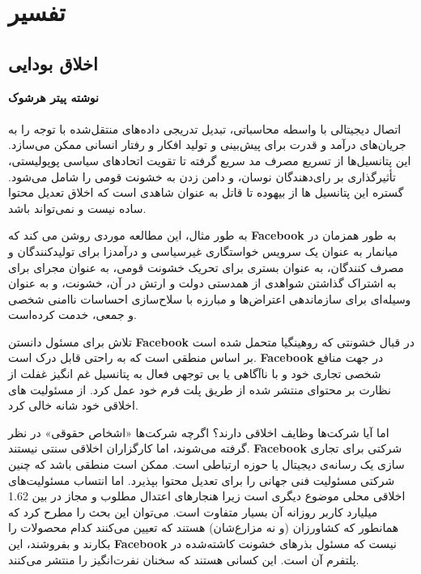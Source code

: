 {
\section*{تفسیر}
\label{sec:تفسیر}


\subsection*{اخلاق بودایی}
\label{subsec:اخلاق بودایی}
\noindent \textbf{نوشته پیتر هرشوک}
\\\\
اتصال دیجیتالی با واسطه محاسباتی، تبدیل تدریجی داده‌های منتقل‌شده با توجه را به جریان‌های درآمد و قدرت برای پیش‌بینی و تولید افکار و رفتار انسانی ممکن می‌سازد. این پتانسیل‌ها از تسریع مصرف مد سریع گرفته تا تقویت اتحادهای سیاسی پوپولیستی، تأثیرگذاری بر رای‌دهندگان نوسان، و دامن زدن به خشونت قومی را شامل می‌شود. گستره این پتانسیل ها از بیهوده تا قاتل به عنوان شاهدی است که اخلاق تعدیل محتوا ساده نیست و نمی‌تواند باشد.
}

به طور مثال، این مطالعه موردی روشن می کند که \textenglish{\textbf{Facebook}} به طور همزمان در میانمار به عنوان یک سرویس خواستگاری غیرسیاسی و درآمدزا برای تولیدکنندگان و مصرف کنندگان، به عنوان بستری برای تحریک خشونت قومی، به عنوان مجرای برای به اشتراک گذاشتن شواهدی از همدستی دولت و ارتش در آن، خشونت، و به عنوان وسیله‌ای برای سازماندهی اعتراض‌ها و مبارزه با سلاح‌سازی احساسات ناامنی شخصی و جمعی، خدمت کرده‌است.

تلاش برای مسئول دانستن \textenglish{\textbf{Facebook}} در قبال خشونتی که روهینگیا متحمل شده است بر اساس منطقی است که به راحتی قابل درک است.
\textenglish{\textbf{Facebook}} در جهت منافع شخصی تجاری خود و با ناآگاهی یا بی توجهی فعال به پتانسیل غم انگیز غفلت از نظارت بر محتوای منتشر شده از طریق پلت فرم خود عمل کرد.
از مسئولیت های اخلاقی خود شانه خالی کرد.

اما آیا شرکت‌ها وظایف اخلاقی دارند؟ اگرچه شرکت‌ها «اشخاص حقوقی» در نظر گرفته می‌شوند، اما کارگزاران اخلاقی سنتی نیستند.
\textenglish{\textbf{Facebook}} شرکتی برای تجاری سازی یک رسانه‌ی دیجیتال یا حوزه ارتباطی است.
ممکن است منطقی باشد که چنین شرکتی مسئولیت فنی جهانی را برای تعدیل محتوا بپذیرد.
اما انتساب مسئولیت‌های اخلاقی محلی موضوع دیگری است زیرا هنجارهای اعتدال مطلوب و مجاز در بین 1.62 میلیارد کاربر روزانه آن بسیار متفاوت است.
می‌توان این بحث را مطرح کرد که همانطور که کشاورزان (و نه مزارع‌شان) هستند که تعیین می‌کنند کدام محصولات را بکارند و بفروشند، این \textenglish{\textbf{Facebook}} نیست که مسئول بذرهای خشونت کاشته‌شده در پلتفرم آن است.
این کسانی هستند که سخنان نفرت‌انگیز را منتشر می‌کنند.

